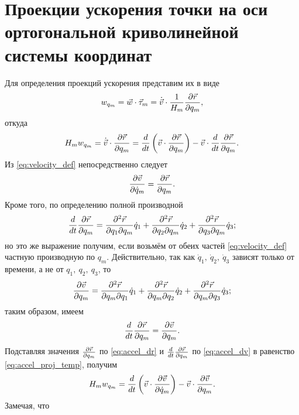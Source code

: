 \section{Проекции ускорения точки на оси ортогональной криволинейной системы
координат}

Для определения проекций ускорения представим их в виде
\begin{equation*}
  w_{q_m} = \dotprod{\vec{w}}{\vec{\tau}_m} =
    \dotprod{\dot{\vec{v}}}{\frac{1}{H_m}}{\parder[\vec{r}]{q_m}},
\end{equation*}
откуда
\begin{equation}
  \label{eq:accel_proj_temp}
  H_m w_{q_m} = \dotprod{\dot{\vec{v}}}{\parder[\vec{r}]{q_m}} =
    \dt \paren{\dotprod{\vec{v}}{\parder[\vec{r}]{q_m}}}
    - \dotprod{\vec{v}}{\dt \parder[\vec{r}]{q_m}}.
\end{equation}
Из \autoref{eq:velocity_def} непосредственно следует
\begin{equation}
  \label{eq:accel_dr}
  \parder[\vec{v}]{\dot{q}_m} = \parder[\vec{r}]{q_m}.
\end{equation}
Кроме того, по определению полной производной
\begin{equation*}
  \dt \parder[\vec{r}]{q_m} = \pparder[\vec{r}]{q_1}{q_m} \dot{q}_1 +
    \pparder[\vec{r}]{q_2}{q_m} \dot{q}_2 +
    \pparder[\vec{r}]{q_3}{q_m} \dot{q}_3;
\end{equation*}
но это же выражение получим, если возьмём от обеих частей
\autoref{eq:velocity_def} частную производную по $q_m$. Действительно, так как
$\dot{q}_1,~\dot{q}_2,~\dot{q}_3$ зависят только от времени, а не от
$q_1,~q_2,~q_3$, то
\begin{equation*}
  \parder[\vec{v}]{q_m} = \pparder[\vec{r}]{q_m}{q_1} \dot{q}_1 +
    \pparder[\vec{r}]{q_m}{q_2} \dot{q}_2 + \pparder[\vec{r}]{q_m}{q_3}
    \dot{q}_3;
\end{equation*}
таким образом, имеем
\begin{equation}
  \label{eq:accel_dv}
  \dt \parder[\vec{r}]{q_m} = \parder[\vec{v}]{q_m}.
\end{equation}
Подставляя значения $\parder[\vec{r}]{q_m}$ по \autoref{eq:accel_dr} и
$\dt \parder[\vec{r}]{q_m}$ по \autoref{eq:accel_dv} в равенство
\ref{eq:accel_proj_temp}, получим
\begin{equation}
  \label{eq:accel_proj_temp2}
  H_m w_{q_m} = \dt \paren{\dotprod{\vec{v}}{\parder[\vec{v}]{\dot{q}_m}}} -
    \dotprod{\vec{v}}{\parder[\vec{v}]{q_m}}.
\end{equation}
Замечая, что
